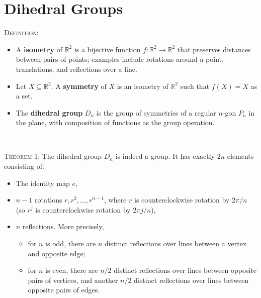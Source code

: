 \documentclass[12pt]{amsart}
\newcommand{\showsol}[1]{\def\displaysol{#1}}
\begin{document}
\showsol{0}
	
	\thispagestyle{empty}
	
	\section*{Dihedral Groups}
	
	

\begin{framed}
\textsc{Definition:}
\begin{itemize}
\item A \textbf{isometry} of $\mathbb{R}^2$ is a bijective function $f:\mathbb{R}^2 \to \mathbb{R}^2$ that preserves distances between pairs of points; examples include rotations around a point, translations, and reflections over a line.

\item Let $X\subseteq \mathbb{R}^2$. A \textbf{symmetry} of $X$ is an isometry of $\mathbb{R}^2$ such that $f(X)=X$ as a set.

\item The \textbf{dihedral group} $D_n$ is the group of symmetries of a regular $n$-gon $P_n$ in the plane, with composition of functions as the group operation.
\end{itemize}


\


\textsc{Theorem 1:} The dihedral group $D_n$ is indeed a group. It has exactly $2n$ elements consisting of:
\begin{itemize} 
\item The identity map $e$,
\item $n-1$ rotations $r, r^2, \dots, r^{n-1}$, where $r$ is counterclockwise rotation by $2\pi/n$ (so $r^j$ is counterclockwise rotation by $2\pi j/n$),
\item $n$ reflections. More precisely, 
\begin{itemize} 
\item for $n$ is odd, there are $n$ distinct reflections over lines between a vertex and opposite edge;
\item for $n$ is even, there are $n/2$ distinct reflections over lines between opposite pairs of vertices, and another $n/2$ distinct reflections over lines between opposite pairs of edges.
\end{itemize}
\end{itemize}

\begin{center}
\begin{minipage}{0.4\textwidth}
\begin{center}


\end{center}
\end{minipage}
\end{center}
\end{framed}
\end{document}
